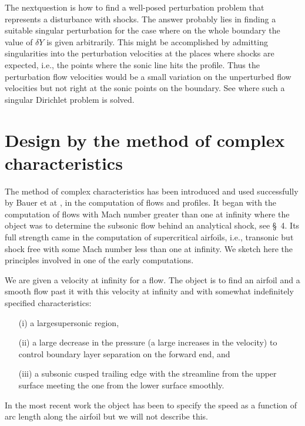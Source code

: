 The next\pageoriginale question is how to find a well-posed perturbation problem that  represents a disturbance with shocks. The answer probably lies in finding a suitable singular perturbation for the case where on the whole boundary the value of $\delta Y$ is given arbitrarily. This might be accomplished by admitting singularities into the perturbation velocities at the places where shocks are expected, i.e., the points where the sonic line hits the profile. Thus the perturbation flow velocities would be a small variation on the unperturbed flow velocities but not right at the sonic points on the boundary. See \cite{key31} where such a singular Dirichlet problem is solved.

\section{Design by the method of complex characteristics}\label{chap3:sec3.11}
The method of complex characteristics has been introduced and used successfully by Bauer et at \cite{key1}, in the computation of flows and profiles. It began with the computation  of flows with Mach number greater than one at infinity where the object was to determine the subsonic flow behind an analytical shock, see \S\ 4. Its full strength came in the computation of supercritical airfoils, i.e., transonic but shock free with some Mach number less than one at infinity. We sketch here the principles involved in one of the early computations.

We are given a velocity at infinity for a flow. The object is to find an airfoil and a smooth flow past it with this velocity at infinity and with somewhat indefinitely specified characteristics:
\begin{itemize}
\item[{\rm (i)}] a large\pageoriginale supersonic region,

\item[{\rm (ii)}] a large decrease in the pressure (a large increases in the velocity) to control boundary layer separation on the forward end, and 

\item[{\rm (iii)}] a subsonic cusped trailing edge with the streamline from the upper surface meeting the one from the lower surface smoothly.
\end{itemize}

In the most recent work the object has been to specify the speed as a function of arc length along the airfoil but we will not describe this.

